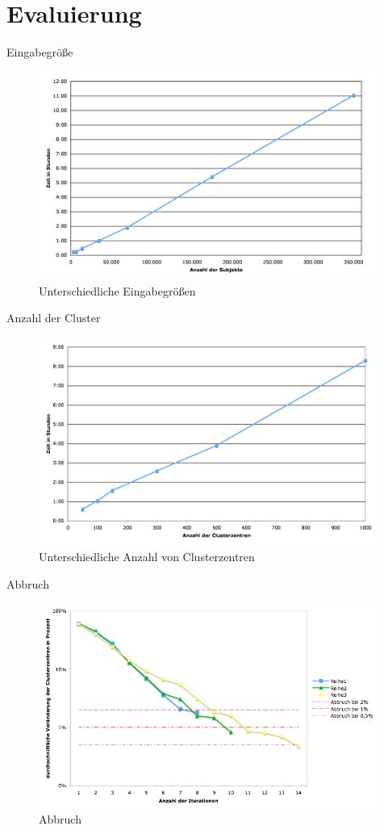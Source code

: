 \documentclass[a4paper]{llncs}
\begin{document}
\section{Evaluierung}
Eingabegröße
\begin{figure}[!ht]
\centering
\includegraphics[width=0.99\textwidth]{charts/subjects.png}
\caption{Unterschiedliche Eingabegrößen}
\label{fig:subjects}
\end{figure}

Anzahl der Cluster
\begin{figure}[!ht]
\centering
\includegraphics[width=0.99\textwidth]{charts/clustercenters.png}
\caption{Unterschiedliche Anzahl von Clusterzentren}
\label{fig:centers}
\end{figure}

Abbruch
\begin{figure}[!ht]
\centering
\includegraphics[width=0.99\textwidth]{charts/iterations_log.png}
\caption{Abbruch}
\label{fig:iterations}
\end{figure}
\end{document}
